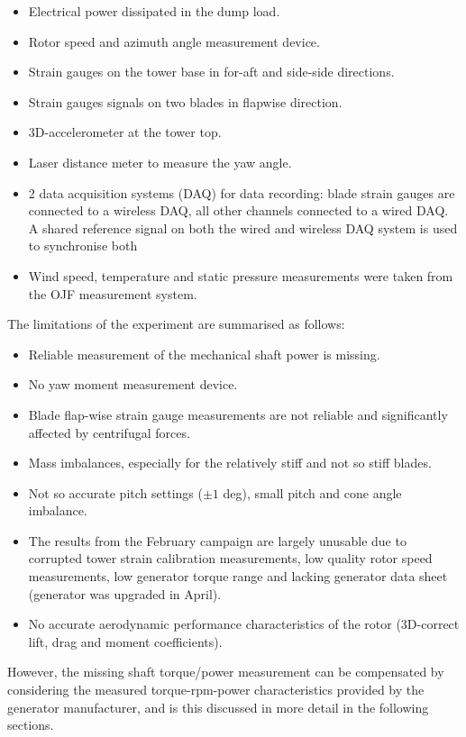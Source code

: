 \documentclass[a4paper]{jpconf}
\begin{document}
\begin{itemize}
	\item Electrical power dissipated in the dump load.
	\item Rotor speed and azimuth angle measurement device.
	\item Strain gauges on the tower base in for-aft and side-side directions.
	\item Strain gauges signals on two blades in flapwise direction.
	\item 3D-accelerometer at the tower top.
	\item Laser distance meter to measure the yaw angle.
	\item 2 data acquisition systems (DAQ) for data recording: blade strain gauges are connected to a wireless DAQ, all other channels connected to a wired DAQ. A shared reference signal on both the wired and wireless DAQ system is used to synchronise both
	\item Wind speed, temperature and static pressure measurements were taken from the  OJF measurement system.
\end{itemize}

The limitations of the experiment are summarised as follows:

\begin{itemize}
	\item Reliable measurement of the mechanical shaft power is missing.
	\item No yaw moment measurement device.
	\item Blade flap-wise strain gauge measurements are not reliable and significantly affected by centrifugal forces.
	\item Mass imbalances, especially for the relatively stiff and not so stiff blades.
	\item Not so accurate pitch settings ($\pm 1$ deg), small pitch and cone angle imbalance.
	\item The results from the February campaign are largely unusable due to corrupted tower strain calibration measurements, low quality rotor speed measurements, low generator torque range and lacking generator data sheet (generator was upgraded in April).
	\item No accurate aerodynamic performance characteristics of the rotor (3D-correct lift, drag and moment coefficients).
\end{itemize}

However, the missing shaft torque/power measurement can be compensated by considering the measured torque-rpm-power characteristics provided by the generator manufacturer, and is this discussed in more detail in the following sections.
\end{document}
